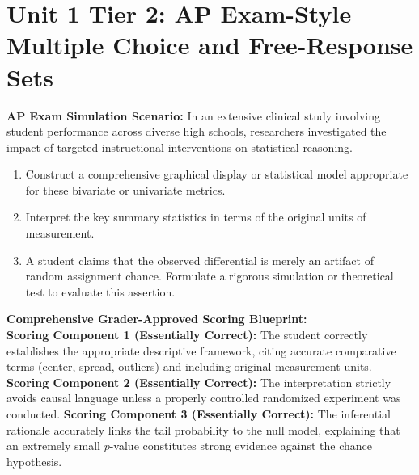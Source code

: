 \section{Unit 1 Tier 2: AP Exam-Style Multiple Choice and Free-Response Sets}
\begin{workbookbox}
\textbf{AP Exam Simulation Scenario:} In an extensive clinical study involving student performance across diverse high schools, researchers investigated the impact of targeted instructional interventions on statistical reasoning.
\begin{enumerate}[label=(\alph*)]
  \item Construct a comprehensive graphical display or statistical model appropriate for these bivariate or univariate metrics.
  \item Interpret the key summary statistics in terms of the original units of measurement.
  \item A student claims that the observed differential is merely an artifact of random assignment chance. Formulate a rigorous simulation or theoretical test to evaluate this assertion.
\end{enumerate}
\textbf{Comprehensive Grader-Approved Scoring Blueprint:}\\
\textbf{Scoring Component 1 (Essentially Correct):} The student correctly establishes the appropriate descriptive framework, citing accurate comparative terms (center, spread, outliers) and including original measurement units.
\textbf{Scoring Component 2 (Essentially Correct):} The interpretation strictly avoids causal language unless a properly controlled randomized experiment was conducted.
\textbf{Scoring Component 3 (Essentially Correct):} The inferential rationale accurately links the tail probability to the null model, explaining that an extremely small $p$-value constitutes strong evidence against the chance hypothesis.
\end{workbookbox}\vspace{6pt}
